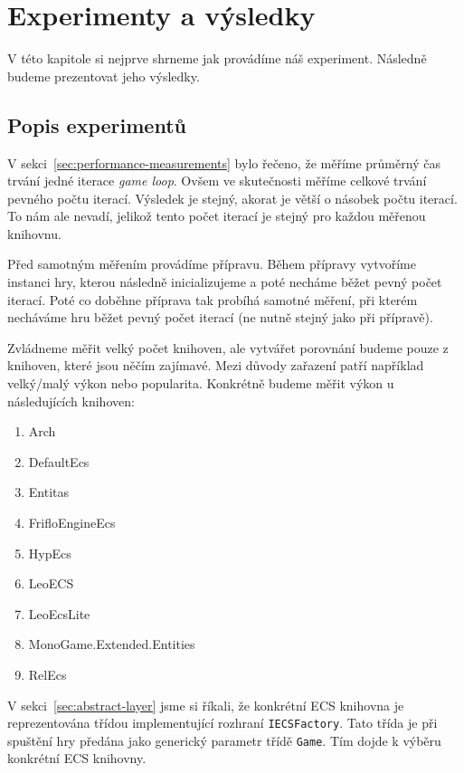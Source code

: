 \chapter{Experimenty a výsledky}
V této kapitole si nejprve shrneme jak provádíme náš experiment. Následně budeme prezentovat jeho výsledky.

\section{Popis experimentů}
V sekci~\ref{sec:performance-measurements} bylo řečeno, že měříme průměrný čas trvání jedné iterace \textit{game loop}. Ovšem ve skutečnosti měříme celkové trvání pevného počtu iterací. Výsledek je stejný, akorat je větší o násobek počtu iterací. To nám ale nevadí, jelikož tento počet iterací je stejný pro každou měřenou knihovnu.

Před samotným měřením provádíme přípravu. Během přípravy vytvoříme instanci hry, kterou následně inicializujeme a poté necháme běžet pevný počet iterací. Poté co doběhne příprava tak probíhá samotné měření, při kterém  necháváme hru běžet pevný počet iterací (ne nutně stejný jako při přípravě).

Zvládneme měřit velký počet knihoven, ale vytvářet porovnání budeme pouze z knihoven, které jsou něčím zajímavé. Mezi důvody zařazení patří například velký/malý výkon nebo popularita. Konkrétně budeme měřit výkon u následujících knihoven:

\begin{enumerate}
    \item Arch~\cite{Arch}
    \item DefaultEcs~\cite{DefaultEcs}
    \item Entitas~\cite{Entitas}
    \item FrifloEngineEcs~\cite{FrifloEngine}
    \item HypEcs~\cite{HypEcs}
    \item LeoECS~\cite{LeoECS}
    \item LeoEcsLite~\cite{LeoEcsLite}
    \item MonoGame.Extended.Entities~\cite{MonoGameExtended}
    \item RelEcs~\cite{RelEcs}
\end{enumerate}

V sekci~\ref{sec:abstract-layer} jsme si říkali, že konkrétní ECS knihovna je reprezentována třídou implementující rozhraní \texttt{IECSFactory}. Tato třída je při spuštění hry předána jako generický parametr třídě \texttt{Game}. Tím dojde k výběru konkrétní ECS knihovny.

